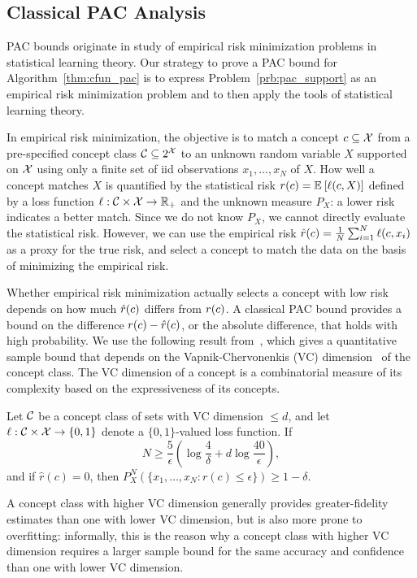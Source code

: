 \documentclass[onefignum,onetabnum]{siamart171218}
\begin{document}
\subsection{Classical PAC Analysis}%
\label{sub:classical_pac_analysis_of_christoffel_function_estimators}

PAC bounds originate in study of empirical
risk minimization problems in statistical learning theory. Our strategy to prove a PAC bound for
Algorithm~\ref{thm:cfun_pac} is to express Problem~\ref{prb:pac_support} as an
empirical risk minimization problem and to then apply the tools of statistical
learning theory.

In empirical risk minimization, the objective is to match a concept
$c\subseteq\mathcal{X}$ from a pre-specified concept class
$\mathcal{C}\subseteq 2^{\mathcal{X}}$ 
to an
unknown random variable $X$ supported on $\mathcal{X}$
using only a finite set of iid observations $x_1,\dotsc,x_N$ of $X$.
How well a concept
matches $X$ is quantified by the statistical risk $r(c)=\mathbb{E}_{ }\left[\ell(c,X)\right]$ defined
by a loss function $\ell:\mathcal{C}\times\mathcal{X}\to\mathbb{R}_+$ and the unknown measure
$P_X$: a lower risk indicates a better match.
Since we do not know $P_X$, we cannot
directly evaluate the statistical risk. However, we can use
the empirical risk
$\hat{r}(c)=\frac{1}{N}\sum_{i=1}^N \ell(c,x_i)$ as a proxy for the true risk, and select a concept
to match the data on the basis of minimizing the empirical risk. 

Whether empirical risk minimization actually selects a concept with low risk
depends on how much $\hat{r}(c)$ differs from $r(c)$. A classical PAC bound
provides a bound on the difference $r(c)-\hat{r}(c)$, or the absolute difference,
that holds with high probability.
We use the following result from~\cite{alamo2009randomized}, which
gives a quantitative sample bound that depends on the
Vapnik-Chervonenkis (VC) dimension~\cite{vidyasagar2002learning} of the concept
class. The VC dimension of a concept is a combinatorial measure of its
complexity based on the expressiveness of its concepts. 
\begin{lemma}
    \label{lem:generic_pac}
    Let $\mathcal{C}$ be a concept class of sets with VC dimension $\le d$, and let
    $\ell:\mathcal{C}\times\mathcal{X}\to\{0,1\}$ denote a $\{0,1\}$-valued loss function.
    If
    \begin{equation}
        \label{eq:generic_pac_bound}
        N \ge \frac{5}{\epsilon}\left( \log\frac{4}{\delta} + d \log\frac{40}{\epsilon} \right),
    \end{equation}
    and if $\hat{r}(c)=0$, then $P_X^N\left(\{x_1,\dotsc,x_N : r(c) \le \epsilon\}\right) \ge 1-\delta$.
\end{lemma}
A concept class with higher VC dimension generally provides greater-fidelity
estimates than one with lower VC dimension, but is also more prone to
overfitting: informally, this is the reason why a concept class with higher VC
dimension requires a larger sample bound for the same accuracy and confidence
than one with lower VC dimension.
\end{document}
